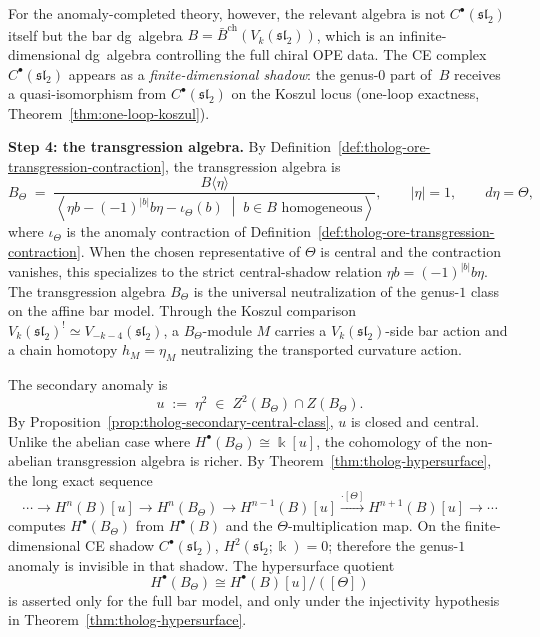 \begin{construction}
For the anomaly-completed theory, however, the relevant algebra is
not $C^\bullet(\mathfrak{sl}_2)$ itself but the bar dg~algebra
$B = \bar B^{\mathrm{ch}}(V_k(\mathfrak{sl}_2))$, which is an
infinite-dimensional dg~algebra controlling the full chiral OPE data.
The CE complex $C^\bullet(\mathfrak{sl}_2)$ appears as a
\emph{finite-dimensional shadow}: the genus-$0$ part of~$B$
receives a quasi-isomorphism from $C^\bullet(\mathfrak{sl}_2)$ on
the Koszul locus (one-loop exactness,
Theorem~\ref{thm:one-loop-koszul}).

\medskip
\noindent\textbf{Step 4: the transgression algebra.}
By Definition~\ref{def:tholog-ore-transgression-contraction}, the
transgression algebra is
\begin{equation}\label{eq:su2-transgression}
B_\Theta
\;=\;
\frac{B\langle\eta\rangle}
{\left\langle
\eta b-(-1)^{|b|}b\eta-\iota_\Theta(b)
\;\middle|\;b\in B\text{ homogeneous}
\right\rangle},
\qquad
|\eta|=1,\qquad d\eta=\Theta,
\end{equation}
where \(\iota_\Theta\) is the anomaly contraction of
Definition~\ref{def:tholog-ore-transgression-contraction}. When the
chosen representative of \(\Theta\) is central and the contraction
vanishes, this specializes to the strict central-shadow relation
\(\eta b=(-1)^{|b|}b\eta\). The transgression algebra
\(B_\Theta\) is the universal neutralization of the genus-\(1\) class
on the affine bar model. Through the Koszul comparison
\(V_k(\mathfrak{sl}_2)^!\simeq
V_{-k-4}(\mathfrak{sl}_2)\), a \(B_\Theta\)-module \(M\) carries a
\(V_k(\mathfrak{sl}_2)\)-side bar action and a chain homotopy
\(h_M=\eta_M\) neutralizing the transported curvature action.

The secondary anomaly is
\begin{equation}\label{eq:su2-secondary}
u \;:=\; \eta^2 \;\in\; Z^2(B_\Theta)\cap Z(B_\Theta).
\end{equation}
By Proposition~\ref{prop:tholog-secondary-central-class}, $u$ is
closed and central. Unlike the abelian case where
$H^\bullet(B_\Theta)\cong \Bbbk[u]$, the cohomology of the
non-abelian transgression algebra is richer. By
Theorem~\ref{thm:tholog-hypersurface}, the long exact sequence
\[
\cdots\to
H^n(B)[u]\to H^n(B_\Theta)\to H^{n-1}(B)[u]
\xrightarrow{\cdot[\Theta]}
H^{n+1}(B)[u]\to\cdots
\]
computes $H^\bullet(B_\Theta)$ from \(H^\bullet(B)\) and the
\(\Theta\)-multiplication map. On the finite-dimensional CE shadow
\(C^\bullet(\mathfrak{sl}_2)\), \(H^2(\mathfrak{sl}_2;\Bbbk)=0\);
therefore the genus-\(1\) anomaly is invisible in that shadow. The
hypersurface quotient
\[
H^\bullet(B_\Theta)\cong H^\bullet(B)[u]/([\Theta])
\]
is asserted only for the full bar model, and only under the
injectivity hypothesis in Theorem~\ref{thm:tholog-hypersurface}.


\end{construction}
